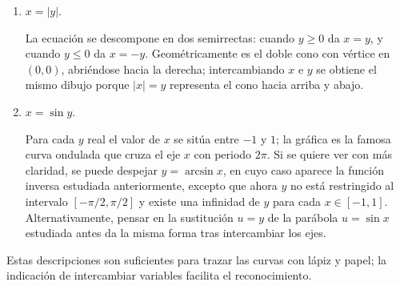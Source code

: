 \begin{enumerate}[label=(\roman*)]
\item $x=|y|$.

  La ecuación se descompone en dos semirrectas: cuando $y\ge0$ da $x=y$,
  y cuando $y\le0$ da $x=-y$. Geométricamente es el doble cono con vértice
  en $(0,0)$, abriéndose hacia la derecha; intercambiando $x$ e $y$ se
  obtiene el mismo dibujo porque $|x|=y$ representa el cono hacia arriba y
  abajo.

  \begin{center}
  \end{center}

\item $x=\sin y$.

  Para cada $y$ real el valor de $x$ se sitúa entre $-1$ y $1$; la gráfica
  es la famosa curva ondulada que cruza el eje $x$ con periodo $2\pi$.
  Si se quiere ver con más claridad, se puede despejar $y=\arcsin x$, en
  cuyo caso aparece la función inversa estudiada anteriormente, excepto
  que ahora $y$ no está restringido al intervalo $[-\pi/2,\pi/2]$ y existe
  una infinidad de $y$ para cada $x\in[-1,1]$. Alternativamente, pensar en
  la sustitución $u=y$ de la parábola $u=\sin x$ estudiada antes da la
  misma forma tras intercambiar los ejes.

  \begin{center}
  \end{center}
\end{enumerate}

Estas descripciones son suficientes para trazar las curvas con lápiz y
papel; la indicación de intercambiar variables facilita el reconocimiento.  
